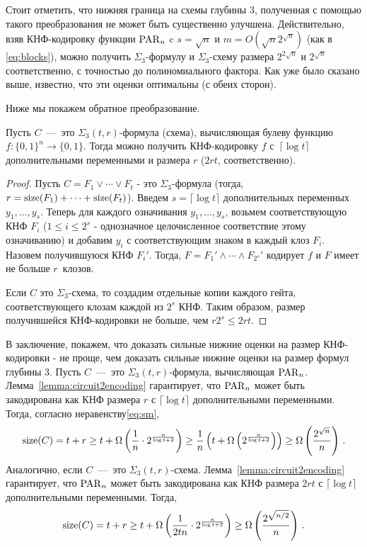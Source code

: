 Стоит отметить, что нижняя граница на схемы глубины $3$, полученная с помощью такого преобразования не может быть существенно улучшена.
Действительно, взяв КНФ-кодировку функции $\operatorname{PAR}_n$ c $s = \sqrt{n}$ и $m = O(\sqrt{n}2^{\sqrt{n}})$ (как в \eqref{eq:blocks}), 
можно получить $\Sigma_3$-формулу и $\Sigma_3$-схему размера $2^{2\sqrt{n}}$ и $2^{\sqrt{n}}$ соответственно, с точностью до полиномиального фактора. 
Как уже было сказано выше, известно, что эти оценки оптимальны (с обеих сторон).

Ниже мы покажем обратное преобразование.

\begin{lemma}\label{lemma:circuit2encoding}
	Пусть $C$~---~это $\Sigma_3(t,r)$-формула (схема), вычисляющая булеву функцию $f \colon \{0,1\}^n \to \{0,1\}$. Тогда можно получить КНФ-кодировку $f$ с~$\lceil \log t \rceil$ дополнительными переменными и размера $r$ ($2rt$, соответственно).
\end{lemma}
\begin{proof}
	Пусть $C=F_1 \lor \dotsb \lor F_{t}$ - это $\Sigma_3$-формула (тогда, $r=\operatorname{size}(F_1)+\dotsb+\operatorname{size}(F_{t})$). Введем $s=\lceil\log t\rceil$ дополнительных переменных $y_1, \dotsc, y_s$. Теперь для каждого означивания $y_1, \dotsc, y_s$, возьмем соответствующую КНФ $F_i$ ($1 \le i \le 2^s$ - однозначное целочисленное соответствие 
	этому означиванию) и добавим
	$y_i$ с соответствующим знаком в каждый клоз $F_i$.
	Назовем получившуюся КНФ $F_i'$. Тогда, $F=F_1'\land \dotsb \land F_{2^s}'$ кодирует $f$ и $F$ имеет не больше $r$~клозов.
	
	Если $C$ это $\Sigma_3$-схема, то создадим отдельные копии каждого гейта, соответствующего клозам каждой из $2^s$ КНФ. 
	Таким образом, размер получившейся КНФ-кодировки не больше, чем  $r2^s \le 2rt$.
\end{proof}

В заключение, покажем, что доказать сильные нижние оценки на размер КНФ-кодировки -
не проще, чем доказать сильные нижние оценки на размер формул глубины $3$.
Пусть $C$~---~это $\Sigma_3(t,r)$-формула, вычисляющая $\operatorname{PAR}_n$.
Лемма~\ref{lemma:circuit2encoding} гарантирует, что $\operatorname{PAR}_n$ может быть закодирована как КНФ размера $r$ с $\lceil \log t \rceil$ дополнительными переменными. 
Тогда, согласно неравенству\eqref{eq:sm},
\[\operatorname{size}(C) = t + r \ge t + \Omega \left( \frac{1}{n}\cdot 2^{\frac{n}{\log t + 2}} \right) \ge \frac 1n \left( t + \Omega\left( 2^{\frac{n}{\log t + 2}}\right)\right) \ge \Omega\left(\frac{2^{\sqrt{n}}}{n}\right) \, .\]
Аналогично, если $C$~---~это $\Sigma_3(t,r)$-схема. Лемма~\ref{lemma:circuit2encoding} гарантирует, что $\operatorname{PAR}_n$ может быть закодирована как КНФ размера $2rt$ с $\lceil \log t \rceil$ дополнительными переменными.
Тогда,
\[\operatorname{size}(C) = t + r \ge t + \Omega \left( \frac{1}{2tn}\cdot 2^{\frac{n}{\log t + 2}} \right) \ge \Omega\left(\frac{2^{\sqrt{n/2}}}{n}\right) \, .\]